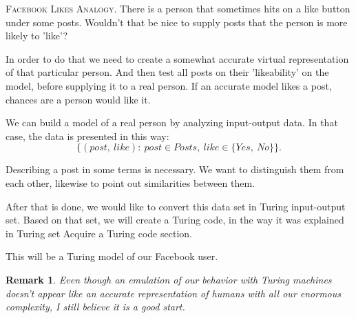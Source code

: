\documentclass[12pt]{article}
\newcommand\tab[1][-1em]{\hspace*{#1}}
\newtheorem*{remark}{Remark}
\begin{document}
\vspace{5mm}
\begin{addmargin}[3em]{3em}
\tab
\textsc{Facebook Likes Analogy.} There is a person that sometimes hits on a like button under some posts. Wouldn't that be nice to supply posts that the person is more likely to 'like'?

In order to do that we need to create a somewhat accurate virtual representation of that particular person. And then test all posts on their 'likeability' on the model, before supplying it to a real person. If an accurate model likes a post, chances are a person would like it.

We can build a model of a real person by analyzing input-output data. In that case, the data is presented in this way: $$\{(post,\ like):\ post\in Posts,\ like\in\{Yes,\ No\}\}.$$

Describing a post in some terms is necessary. We want to distinguish them from each other, likewise to point out similarities between them.

After that is done, we would like to convert this data set in Turing input-output set. Based on that set, we will create a Turing code, in the way it was explained in Turing set \textsf{Acquire a Turing code
} section.

This will be a Turing model of our Facebook user. 
\end{addmargin}

\begin{remark}
Even though an emulation of our behavior with Turing machines doesn't appear like an accurate representation of humans with all our enormous complexity, I still believe it is a good start.
\end{remark}


\end{document}
